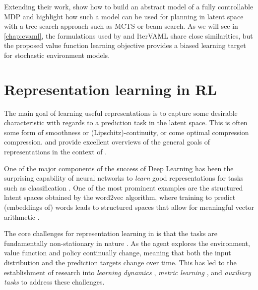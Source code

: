 Extending their work, \textcite{oh2017value} show how to build an abstract model of a fully controllable MDP and highlight how such a model can be used for planning in latent space with a tree search approach such as MCTS \parencite{schrittwieser2020mastering} or beam search.
As we will see in \autoref{chap:cvaml}, the formulations used by \textcite{silver2017predictron,schrittwieser2020mastering} and IterVAML share close similarities, but the proposed value function learning objective provides a biased learning target for stochastic environment models.

\section{Representation learning in RL}

The main goal of learning useful representations is to capture some desirable characteristic with regards to a prediction task in the latent space.
This is often some form of smoothness or (Lipschitz)-continuity, or come optimal compression compression.
\textcite{abel2020thesis} and \textcite{le2021metrics} provide excellent overviews of the general goals of representations in the context of .

One of the major components of the success of Deep Learning has been the surprising capability of neural networks to \emph{learn} good representations for tasks such as classification \parencite{bengio2012representation}.
One of the most prominent examples are the structured latent spaces obtained by the word2vec algorithm, where training to predict (embeddings of) words leads to structured spaces that allow for meaningful vector arithmetic \parencite{mikolov2013distributed,goldberg2014word2vec}.

The core challenges for representation learning in  is that the tasks are fundamentally non-stationary in nature \parencite{kumar2021implicit,nikishin2022primacy}.
As the agent explores the environment, value function and policy continually change, meaning that both the input distribution and the prediction targets change over time.
This has led to the establishment of research into \emph{learning dynamics} \parencite{lyle2022learning,lyle2022understanding}, \emph{metric learning} \parencite{ferns2011bisimulation,barreto2017successor,borsa2018universal,le2021metrics}, and \emph{auxiliary tasks} \parencite{jaderberg2017reinforcement,bellemare2019geometric,lyle2021effect,farebrother2023protovalue} to address these challenges.

